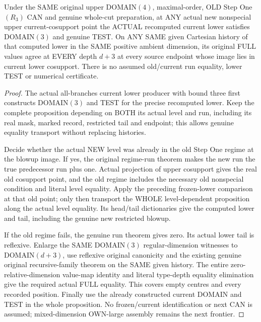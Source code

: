 \begin{theorem}
\label{hir:original-prepared-bound-four-current-lower-full-etale-values}
\leanok
Under the SAME original upper DOMAIN$(4)$, maximal-order, OLD Step
One$(R_3)$ CAN and genuine whole-cut preparation, at ANY actual new
nonspecial upper current-cosupport point the ACTUAL recomputed current
lower satisfies DOMAIN$(3)$ and genuine TEST. On ANY SAME given
Cartesian history of that computed lower in the SAME positive ambient
dimension, its original FULL values agree at EVERY depth $d+3$ at every
source endpoint whose image lies in current lower cosupport. There is
no assumed old/current run equality, lower TEST or numerical certificate.
\end{theorem}
\begin{proof}
The actual all-branches current lower producer with bound three first
constructs DOMAIN$(3)$ and TEST for the precise recomputed lower. Keep
the complete proposition depending on BOTH its actual level and run,
including its real mask, marked record, restricted tail and endpoint;
this allows genuine equality transport without replacing histories.

Decide whether the actual NEW level was already in the old Step One
regime at the blowup image. If yes, the original regime-run theorem
makes the new run the true predecessor run plus one. Actual projection
of upper cosupport gives the real old cosupport point, and the old
regime includes the necessary old nonspecial condition and literal
level equality. Apply the preceding frozen-lower comparison at that
old point; only then transport the WHOLE level-dependent proposition
along the actual level equality. Its head/tail dictionaries give the
computed lower and tail, including the genuine new restricted blowup.

If the old regime fails, the genuine run theorem gives zero. Its actual
lower tail is reflexive. Enlarge the SAME DOMAIN$(3)$ regular-dimension
witnesses to DOMAIN$(d+3)$, use reflexive original canonicity and the
existing genuine original recursive-family theorem on the SAME given
history. The entire zero-relative-dimension value-map identity and
literal type-depth equality elimination give the required actual FULL
equality. This covers empty centres and every recorded position.
Finally use the already constructed current DOMAIN and TEST in the
whole proposition. No frozen/current identification or next CAN is
assumed; mixed-dimension OWN-large assembly remains the next frontier.
\end{proof}
